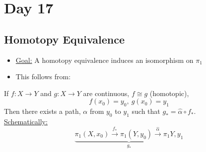 \documentclass[../notes.tex]{subfiles}
\begin{document}
\section{Day 17}
\subsection{Homotopy Equivalence}
\begin{itemize}
    \item \underline{Goal:} A homotopy equivalence induces an isomorphism on $\pi_1$
    \item This follows from:
\end{itemize}
\begin{theorem}
    If $f: X\rightarrow Y$ and $g: X\rightarrow Y$ are continuous, $f\cong g$ (homotopic),
    \[
        f(x_0)=y_0,\ g(x_0)=y_1
    \]
    Then there exists a path, $\alpha$ from $y_0$ to $y_1$ such that 
    $g_* = \hat{\alpha}\circ f_*$.\\
    \underline{Schematically:}
    \[
        \underbrace{\pi_1(X,x_0)\xrightarrow{f_*}\pi_1(Y,y_0)
            \xrightarrow{\hat{{\alpha}}}\pi_1{Y,y_1}}_{g_*}
    \]
\end{theorem}
\end{document}
